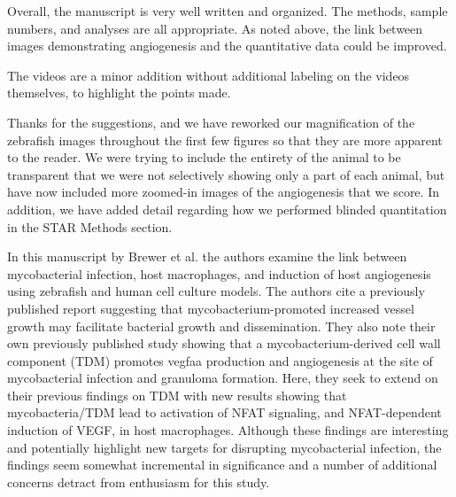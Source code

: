 \begin{description}[style=multiline, labelwidth=\widthof{Reviewer \#2:   }, font=\normalfont, leftmargin=\labelwidth, align=right]
\item[Reviewer \#1: ] \quad Overall, the manuscript is very well written and organized. The methods, sample numbers, and analyses are all appropriate. As noted above, the link between images demonstrating angiogenesis and the quantitative data could be improved.

\item \quad The videos are a minor addition without additional labeling on the videos themselves, to highlight the points made.

\item[Response: ] \quad Thanks for the suggestions, and we have reworked our magnification of the zebrafish images throughout the first few figures so that they are more apparent to the reader. We were trying to include the entirety of the animal to be transparent that we were not selectively showing only a part of each animal, but have now included more zoomed\hyp{}in images of the angiogenesis that we score. In addition, we have added detail regarding how we performed blinded quantitation in the STAR Methods section.

\item[Reviewer \#2: ] \quad In this manuscript by Brewer et al. the authors examine the link between mycobacterial infection, host macrophages, and induction of host angiogenesis using zebrafish and human cell culture models. The authors cite a previously published report suggesting that mycobacterium\hyp{}promoted increased vessel growth may facilitate bacterial growth and dissemination. They also note their own previously published study showing that a mycobacterium\hyp{}derived cell wall component (TDM) promotes vegfaa production and angiogenesis at the site of mycobacterial infection and granuloma formation. Here, they seek to extend on their previous findings on TDM with new results showing that mycobacteria/TDM lead to activation of NFAT signaling, and NFAT\hyp{}dependent induction of VEGF, in host macrophages. Although these findings are interesting and potentially highlight new targets for disrupting mycobacterial infection, the findings seem somewhat incremental in significance and a number of additional concerns detract from enthusiasm for this study.


\end{description}
